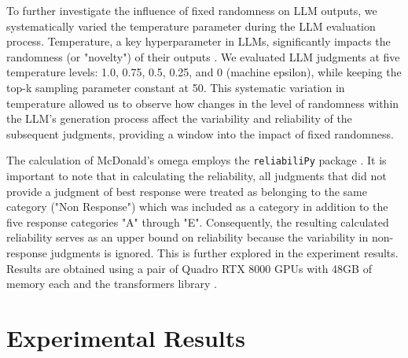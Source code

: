 \documentclass[11pt]{article}
\begin{document}
To further investigate the influence of fixed randomness on LLM outputs, we systematically varied the temperature parameter during the LLM evaluation process. Temperature, a key hyperparameter in LLMs, significantly impacts the randomness (or "novelty") of their outputs \citep{peeperkorn2024temperature, davis2024temperature}. We evaluated LLM judgments at five temperature levels: 1.0, 0.75, 0.5, 0.25, and 0 (machine epsilon), while keeping the top-k sampling parameter constant at 50. This systematic variation in temperature allowed us to observe how changes in the level of randomness within the LLM's generation process affect the variability and reliability of the subsequent judgments, providing a window into the impact of fixed randomness. 


The calculation of McDonald's omega employs the \texttt{reliabiliPy} package \citep{rafael_valero_fernandez_2022_5830894}. It is important to note that in calculating the reliability, all judgments that did not provide a judgment of best response were treated as belonging to the same category ("Non Response") which was included as a category in addition to the five response categories "A" through "E". Consequently, the resulting calculated reliability serves as an upper bound on reliability because the variability in non-response judgments is ignored. This is further explored in the experiment results. Results are obtained using a pair of Quadro RTX 8000 GPUs with 48GB of memory each and the transformers library \citep{wolf2020transformers}.

\section{Experimental Results}
\end{document}
